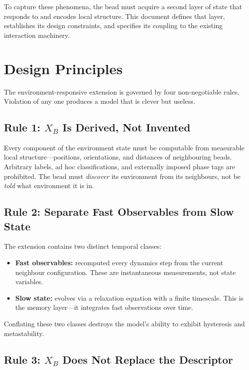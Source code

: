 \documentclass[11pt]{article}
\begin{document}
To capture these phenomena, the bead must acquire a second layer of state
that responds to and encodes local structure.  This document defines that
layer, establishes its design constraints, and specifies its coupling to the
existing interaction machinery.

\section{Design Principles}

The environment-responsive extension is governed by four non-negotiable
rules.  Violation of any one produces a model that is clever but useless.

\subsection{Rule 1: $X_B$ Is Derived, Not Invented}

Every component of the environment state must be computable from measurable
local structure---positions, orientations, and distances of neighbouring
beads.  Arbitrary labels, ad hoc classifications, and externally imposed
phase tags are prohibited.  The bead must \emph{discover} its environment
from its neighbours, not be \emph{told} what environment it is in.

\subsection{Rule 2: Separate Fast Observables from Slow State}

The extension contains two distinct temporal classes:
\begin{itemize}
    \item \textbf{Fast observables:} recomputed every dynamics step from
          the current neighbour configuration.  These are instantaneous
          measurements, not state variables.
    \item \textbf{Slow state:} evolves via a relaxation equation with a
          finite timescale.  This is the memory layer---it integrates
          fast observations over time.
\end{itemize}
Conflating these two classes destroys the model's ability to exhibit
hysteresis and metastability.

\subsection{Rule 3: $X_B$ Does Not Replace the Descriptor}
\end{document}
